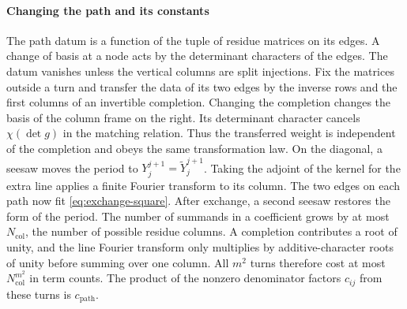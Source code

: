 \paragraph{Changing the path and its constants}
The path datum is a function of the tuple of residue matrices on its
edges. A change of basis at a node acts by the determinant characters
of the edges. The datum vanishes unless the vertical columns are
split injections. Fix the matrices outside a turn and transfer the
data of its two edges by the inverse rows and the first columns of
an invertible completion. Changing the completion changes the basis
of the column frame on the right. Its determinant character cancels
\(\chi(\det g)\) in the matching relation. Thus the transferred weight
is independent of the completion and obeys the same transformation law.
On the diagonal, a seesaw moves the period to
\(Y^{j+1}_j=\widetilde Y^{j+1}_j\). Taking the adjoint of the kernel
for the extra line applies a finite Fourier transform to its column.
The two edges on each path now fit \eqref{eq:exchange-square}.
After exchange, a second seesaw restores the form of the period.
The number of summands in a coefficient grows by at most \(N_\mathrm{col}\),
the number of possible residue columns. A completion contributes
a root of unity, and the line Fourier transform only multiplies by
additive-character roots of unity before summing over one column.
All \(m^2\) turns therefore cost at most \(N_\mathrm{col}^{m^2}\) in
term counts. The product of the nonzero denominator factors \(c_{ij}\)
from these turns is \(c_{\mathrm{path}}\).

